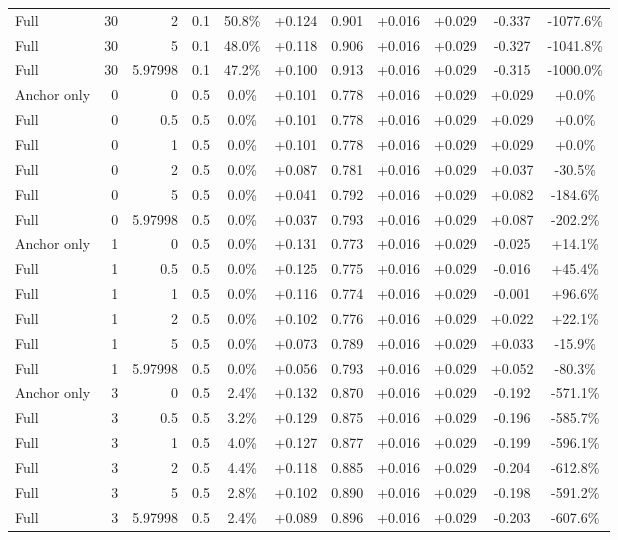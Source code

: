 \begin{table}[htbp]
\begin{tabular}{lrrrccccccc}
Full & 30 & 2 & 0.1 & 50.8\% & +0.124 & 0.901 & +0.016 & +0.029 & -0.337 & -1077.6\% \\
Full & 30 & 5 & 0.1 & 48.0\% & +0.118 & 0.906 & +0.016 & +0.029 & -0.327 & -1041.8\% \\
Full & 30 & 5.97998 & 0.1 & 47.2\% & +0.100 & 0.913 & +0.016 & +0.029 & -0.315 & -1000.0\% \\
Anchor only & 0 & 0 & 0.5 & 0.0\% & +0.101 & 0.778 & +0.016 & +0.029 & +0.029 & +0.0\% \\
Full & 0 & 0.5 & 0.5 & 0.0\% & +0.101 & 0.778 & +0.016 & +0.029 & +0.029 & +0.0\% \\
Full & 0 & 1 & 0.5 & 0.0\% & +0.101 & 0.778 & +0.016 & +0.029 & +0.029 & +0.0\% \\
Full & 0 & 2 & 0.5 & 0.0\% & +0.087 & 0.781 & +0.016 & +0.029 & +0.037 & -30.5\% \\
Full & 0 & 5 & 0.5 & 0.0\% & +0.041 & 0.792 & +0.016 & +0.029 & +0.082 & -184.6\% \\
Full & 0 & 5.97998 & 0.5 & 0.0\% & +0.037 & 0.793 & +0.016 & +0.029 & +0.087 & -202.2\% \\
Anchor only & 1 & 0 & 0.5 & 0.0\% & +0.131 & 0.773 & +0.016 & +0.029 & -0.025 & +14.1\% \\
Full & 1 & 0.5 & 0.5 & 0.0\% & +0.125 & 0.775 & +0.016 & +0.029 & -0.016 & +45.4\% \\
Full & 1 & 1 & 0.5 & 0.0\% & +0.116 & 0.774 & +0.016 & +0.029 & -0.001 & +96.6\% \\
Full & 1 & 2 & 0.5 & 0.0\% & +0.102 & 0.776 & +0.016 & +0.029 & +0.022 & +22.1\% \\
Full & 1 & 5 & 0.5 & 0.0\% & +0.073 & 0.789 & +0.016 & +0.029 & +0.033 & -15.9\% \\
Full & 1 & 5.97998 & 0.5 & 0.0\% & +0.056 & 0.793 & +0.016 & +0.029 & +0.052 & -80.3\% \\
Anchor only & 3 & 0 & 0.5 & 2.4\% & +0.132 & 0.870 & +0.016 & +0.029 & -0.192 & -571.1\% \\
Full & 3 & 0.5 & 0.5 & 3.2\% & +0.129 & 0.875 & +0.016 & +0.029 & -0.196 & -585.7\% \\
Full & 3 & 1 & 0.5 & 4.0\% & +0.127 & 0.877 & +0.016 & +0.029 & -0.199 & -596.1\% \\
Full & 3 & 2 & 0.5 & 4.4\% & +0.118 & 0.885 & +0.016 & +0.029 & -0.204 & -612.8\% \\
Full & 3 & 5 & 0.5 & 2.8\% & +0.102 & 0.890 & +0.016 & +0.029 & -0.198 & -591.2\% \\
Full & 3 & 5.97998 & 0.5 & 2.4\% & +0.089 & 0.896 & +0.016 & +0.029 & -0.203 & -607.6\% \\

\end{tabular}
\end{table}
